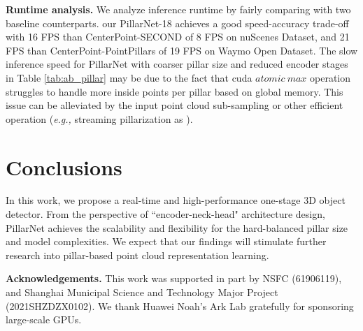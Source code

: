 \documentclass[runningheads]{llncs}
\begin{document}
{\flushleft \bf Runtime analysis.}
We analyze inference runtime by fairly comparing with two baseline counterparts.
our PillarNet-18 achieves a good speed-accuracy trade-off with 16 FPS than CenterPoint-SECOND of 8 FPS on nuScenes Dataset, and 21 FPS than CenterPoint-PointPillars of 19 FPS on Waymo Open Dataset.
The slow inference speed for PillarNet with coarser pillar size and reduced encoder stages in Table \ref{tab:ab_pillar} may be due to the fact that cuda $atomic \ max$ operation struggles to handle more inside points per pillar based on global memory.
This issue can be alleviated by the input point cloud sub-sampling or other efficient operation (\textit{e.g.,} streaming pillarization as \cite{chen2021polarstream}).


\section{Conclusions}

In this work, we propose a real-time and high-performance one-stage 3D object detector. From the perspective of ``encoder-neck-head" architecture design, PillarNet achieves the scalability and flexibility for the hard-balanced pillar size and model complexities. 
We expect that our findings will stimulate further research into pillar-based point cloud representation learning.


{\flushleft \bf Acknowledgements.}
This work was supported in part by NSFC (61906119), and Shanghai Municipal Science and Technology Major Project (2021SHZDZX0102). We thank Huawei Noah’s Ark Lab gratefully for sponsoring large-scale GPUs. 







\clearpage


\end{document}
